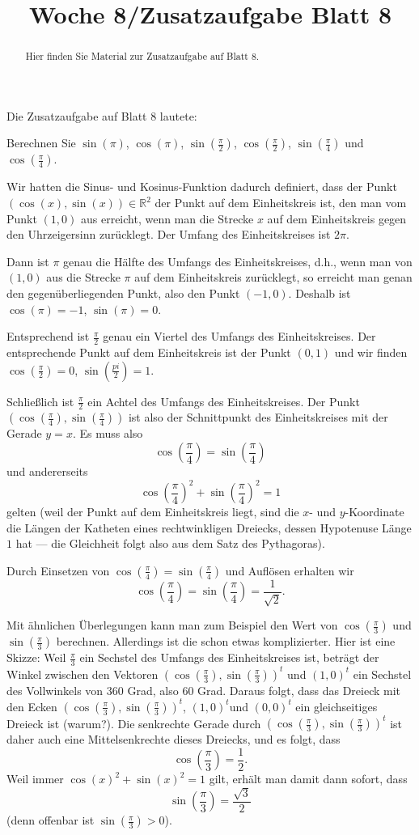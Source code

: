 \documentclass{ximera}
\title{Woche 8/Zusatzaufgabe Blatt 8}
\begin{document}
\begin{abstract}
Hier finden Sie Material zur Zusatzaufgabe auf Blatt 8.
\end{abstract}
\maketitle

Die Zusatzaufgabe auf Blatt 8 lautete:

Berechnen Sie $\sin(\pi)$, $\cos(\pi)$, $\sin(\frac{\pi}{2})$, $\cos(\frac{\pi}{2})$, $\sin(\frac{\pi}{4})$ und $\cos(\frac{\pi}{4})$.


Wir hatten die Sinus- und Kosinus-Funktion dadurch definiert, dass der Punkt $(\cos(x), \sin(x))\in\mathbb R^2$ der Punkt auf dem Einheitskreis ist, den man vom Punkt $(1,0)$ aus erreicht, wenn man die Strecke $x$ auf dem Einheitskreis gegen den Uhrzeigersinn zurücklegt. Der Umfang des Einheitskreises ist $2\pi$.

Dann ist $\pi$ genau die Hälfte des Umfangs des Einheitskreises, d.h., wenn man von $(1,0)$ aus die Strecke $\pi$ auf dem Einheitskreis zurücklegt, so erreicht man genan den gegenüberliegenden Punkt, also den Punkt $(-1,0)$. Deshalb ist $\cos(\pi) = -1$, $\sin(\pi) = 0$.

Entsprechend ist $\frac{\pi}{2}$ genau ein Viertel des Umfangs des Einheitskreises. Der entsprechende Punkt auf dem Einheitskreis ist der Punkt $(0,1)$ und wir finden $\cos(\frac{\pi}{2}) = 0$, $\sin(\frac{pi}{2}) = 1$.

Schließlich ist $\frac{\pi}{2}$ ein Achtel des Umfangs des Einheitskreises. Der Punkt $(\cos(\frac{\pi}{4}), \sin(\frac{\pi}{4}))$ ist also der Schnittpunkt des Einheitskreises mit der Gerade $y=x$. Es muss also
\[
\cos(\frac{\pi}{4}) =  \sin(\frac{\pi}{4})
\]
und andererseits
\[
\cos(\frac{\pi}{4})^2 + \sin(\frac{\pi}{4})^2 = 1
\]
gelten (weil der Punkt auf dem Einheitskreis liegt, sind die $x$- und $y$-Koordinate die Längen der Katheten eines rechtwinkligen Dreiecks, dessen Hypotenuse Länge $1$ hat --- die Gleichheit folgt also aus dem Satz des Pythagoras).

Durch Einsetzen von $\cos(\frac{\pi}{4}) =  \sin(\frac{\pi}{4})$ und Auflösen erhalten wir
\[
\cos(\frac{\pi}{4}) =  \sin(\frac{\pi}{4}) = \frac{1}{\sqrt{2}}.
\]


Mit ähnlichen Überlegungen kann man zum Beispiel den Wert von $\cos(\frac{\pi}{3})$ und $\sin(\frac{\pi}{3})$ berechnen. Allerdings ist die schon etwas komplizierter. Hier ist eine Skizze: Weil $\frac{\pi}{3}$ ein Sechstel des Umfangs des Einheitskreises ist, beträgt der Winkel zwischen den Vektoren $(\cos(\frac{\pi}{3}), \sin(\frac{\pi}{3}))^t$ und $(1,0)^t$ ein Sechstel des Vollwinkels von $360$ Grad, also $60$ Grad. Daraus folgt, dass das Dreieck mit den Ecken $(\cos(\frac{\pi}{3}), \sin(\frac{\pi}{3}))^t$, $(1,0)^t$und $(0,0)^t$ ein gleichseitiges Dreieck ist (warum?). Die senkrechte Gerade durch $(\cos(\frac{\pi}{3}), \sin(\frac{\pi}{3}))^t$ ist daher auch eine Mittelsenkrechte dieses Dreiecks, und es folgt, dass
\[
\cos(\frac{\pi}{3}) = \frac 12.
\]
Weil immer $\cos(x)^2 + \sin(x)^2 = 1$ gilt, erhält man damit dann sofort, dass
\[
\sin(\frac{\pi}{3}) = \frac{\sqrt{3}}{2}
\]
(denn offenbar ist $\sin(\frac{\pi}{3})>0$).
\end{document}
